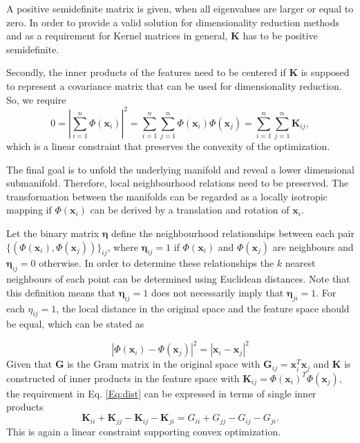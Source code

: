 \documentclass[a4paper,12pt]{article}
\newcommand{\mx}{\mathbf{x}}
\newcommand{\mG}{\mathbf{G}}
\newcommand{\mK}{\mathbf{K}}
\newcommand{\G}{\textbf{G}}
\newcommand{\K}{\textbf{K}}
\begin{document}
A positive semidefinite matrix is given, when all eigenvalues are larger or equal to zero. In order to provide a valid solution for dimensionality reduction methods and as a requirement for Kernel matrices in general, $\mK$ has to be positive semidefinite.

Secondly, the inner products of the features need to be centered if $\mK$ is supposed to represent a covariance matrix that can be used for dimensionality reduction. So, we require
\begin{equation}
0 = |\sum_{i = 1}^n\Phi(\mx_i)|^2 = \sum_{i = 1}^n\sum_{j = 1}^n\Phi(\mx_i)\Phi(\mx_j) =  \sum_{i = 1}^n\sum_{j = 1}^n \mK_{ij},
\end{equation}
which is a linear constraint that preserves the convexity of the optimization.

The final goal is to unfold the underlying manifold and reveal a lower dimensional submanifold. Therefore, local neighbourhood relations need to be preserved. The transformation between the manifolds can be regarded as a locally isotropic mapping if $\Phi(\mx_i)$ can be derived by a translation and rotation of $\mx_i$.

Let the binary matrix $\mathbf{\eta}$ define the neighbourhood relationships between each pair $\{(\Phi(\mx_i),\Phi(\mx_j))\}_{ij}$, where $\mathbf{\eta}_{ij} = 1$ if $\Phi(\mx_i)$ and $\Phi(\mx_j)$ are neighbours and $\mathbf{\eta}_{ij} = 0$ otherwise. In order to determine these relationships the $k$ nearest neighbours of each point can be determined using Euclidean distances. Note that this definition means that $\mathbf{\eta}_{ij} = 1$ does not necessarily imply that $\mathbf{\eta}_{ji} = 1$. For each $\eta_{ij} = 1$, the local distance in the original space and the feature space should be equal, which can be stated as 

\begin{equation}
|\Phi(\mx_i) - \Phi(\mx_j)|^2 = |\mx_i - \mx_j|^2 \label{Eq:dist}
\end{equation}
Given that $\mG$ is the Gram matrix in the original space with \G$_{ij} = \mx_i^T \mx_j$ and $\mK$ is constructed of inner products in the feature space %
with \K$_{ij} = \Phi(\mx_i)^T \Phi(\mx_j)$, the requirement in Eq. \ref{Eq:dist} can be expressed in terms of single inner products
\begin{equation}
\mK_{ii} + \mK_{jj} - \mK_{ij} - \mK_{ji}  = G_{ii} + G_{jj} - G_{ij} - G_{ji}. 
\end{equation}
This is again a linear constraint supporting convex optimization.
\end{document}
